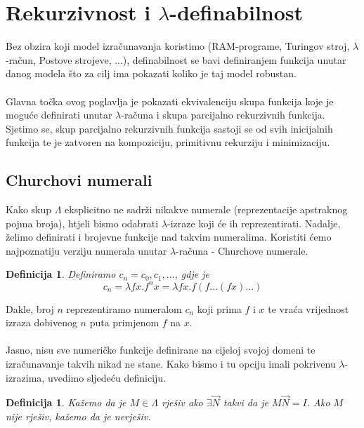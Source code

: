 \documentclass[a4paper,12pt]{article}
\newtheorem{defn}[thm]{Definicija}
\begin{document}
\newpage
%
%

\section{Rekurzivnost i $\lambda$-definabilnost}

Bez obzira koji model izračunavanja koristimo (RAM-programe, Turingov stroj, $\lambda$-račun, Postove strojeve, ...), definabilnost se bavi definiranjem funkcija unutar danog modela što za cilj ima pokazati koliko je taj model robustan.
\\\\
Glavna točka ovog poglavlja je pokazati ekvivalenciju skupa funkcija koje je moguće definirati unutar $\lambda$-računa i skupa parcijalno rekurzivnih funkcija. Sjetimo se, skup parcijalno rekurzivnih funkcija sastoji se od svih inicijalnih funkcija te je zatvoren na kompoziciju, primitivnu rekurziju i minimizaciju.

\subsection{Churchovi numerali}

Kako skup $\Lambda$ eksplicitno ne sadrži nikakve numerale (reprezentacije apstraknog pojma broja), htjeli bismo odabrati $\lambda$-izraze koji će ih reprezentirati. Nadalje, želimo definirati i brojevne funkcije nad takvim numeralima. Koristiti ćemo najpoznatiju verziju numerala unutar $\lambda$-računa - Churchove numerale.

\begin{defn} Definiramo $c_n = c_0,c_1,...$, gdje je
	\[ c_n = \lambda f x. f^n x  = \lambda f x. f (f ... (f x) ...) \]
\end{defn}
%
Dakle, broj $n$ reprezentiramo numeralom $c_n$ koji prima $f$ i $x$ te vraća vrijednost izraza dobivenog $n$ puta primjenom $f$ na $x$.
\\\\
Jasno, nisu sve numeričke funkcije definirane na cijeloj svojoj domeni te izračunavanje takvih nikad ne stane. Kako bismo i tu opciju imali pokrivenu $\lambda$-izrazima, uvedimo sljedeću definiciju.

\begin{defn} Kažemo da je $M \in \Lambda$ rješiv ako $\exists \overrightarrow{N}$ takvi da je $M \overrightarrow{N} = I$. Ako $M$ nije rješiv, kažemo da je nerješiv.
\end{defn}
\end{document}
